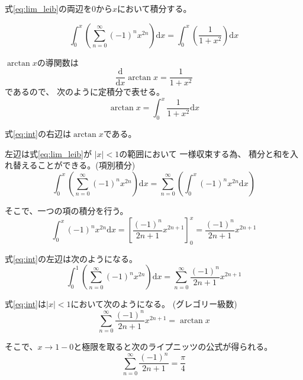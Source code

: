 \documentclass[12pt,b5paper]{ltjsarticle}
\begin{document}
 式\eqref{eq:lim_leib}の両辺を$0$から$x$において積分する。

 \begin{equation}\label{eq:int}
  \int_{0}^{x} \left( \sum_{n=0}^{\infty} (-1)^{n}x^{2n} \right) \mathrm{d}x
   = \int_{0}^{x} \left( \frac{1}{1+x^{2}} \right) \mathrm{d}x
 \end{equation}

$\arctan{x}$の導関数は
\begin{equation}
 \frac{\mathrm{d}}{\mathrm{d}x}\arctan{x} = \frac{1}{1+x^2}
\end{equation}
であるので、
次のように定積分で表せる。
\begin{equation}
 \arctan{x} = \int_{0}^{x} \frac{1}{1+x^2}\mathrm{d}x
\end{equation}

 式\eqref{eq:int}の右辺は$\arctan{x}$である。


 左辺は式\eqref{eq:lim_leib}が
 $\lvert x \rvert <1$の範囲において
 一様収束する為、
 積分と和を入れ替えることができる。(項別積分)
 \begin{equation}
  \int_{0}^{x} \left( \sum_{n=0}^{\infty} (-1)^{n}x^{2n} \right) \mathrm{d}x
   =
   \sum_{n=0}^{\infty} \left( \int_{0}^{x} (-1)^{n}x^{2n} \mathrm{d}x \right)
 \end{equation}


 そこで、一つの項の積分を行う。
 \begin{equation}
  \int_{0}^{x} (-1)^{n}x^{2n} \mathrm{d}x
   = \left[ \frac{(-1)^{n}}{2n+1} x^{2n+1} \right]_{0}^{x}
   = \frac{(-1)^{n}}{2n+1} x^{2n+1}
 \end{equation}

 式\eqref{eq:int}の左辺は次のようになる。
 \begin{equation}
  \int_{0}^{1} \left( \sum_{n=0}^{\infty} (-1)^{n}x^{2n} \right) \mathrm{d}x
   = \sum_{n=0}^{\infty} \frac{(-1)^{n}}{2n+1} x^{2n+1}
 \end{equation}

式\eqref{eq:int}は$\lvert x \rvert <1$において次のようになる。
(グレゴリー級数)
 \begin{equation}
  \sum_{n=0}^{\infty} \frac{(-1)^{n}}{2n+1} x^{2n+1}
   = \arctan{x}
 \end{equation}


 そこで、$x\to 1-0$と極限を取ると次のライプニッツの公式が得られる。
 \begin{equation}
  \sum_{n=0}^{\infty} \frac{(-1)^{n}}{2n+1}
   = \frac{\pi}{4}
 \end{equation}



\hrulefill
\end{document}
